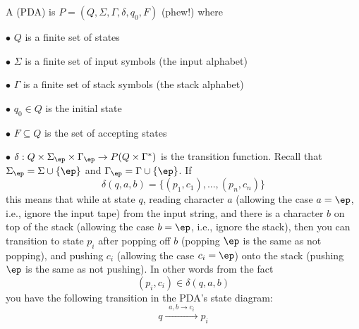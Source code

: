 \begin{defn}
A  (PDA) is $P = (Q, \Sigma, \Gamma, \delta,
q_0, F)$ (phew!) where
\begin{tightlist}
\item[$\bullet$] $Q$ is a finite set of states
\item[$\bullet$] $\Sigma$ is a finite set of input symbols (the input alphabet)
\item[$\bullet$] $\Gamma$ is a finite set of stack symbols (the stack alphabet)
\item[$\bullet$] $q_0 \in Q$ is the initial state
\item[$\bullet$] $F \subseteq Q$ is the set of accepting states
\item[$\bullet$] $\delta : Q \times \Sigma_\ep \times \Gamma_\ep
\rightarrow P(Q \times \Gamma^*)$ is the transition function.
Recall that $\Sigma_\ep = \Sigma \cup \{\ep\}$ and
$\Gamma_\ep = \Gamma \cup \{\ep\}$.
If
\[
\delta(q, a, b) = \{(p_1, c_1), ..., (p_n, c_n)\}
\]
this means that while at state $q$, reading character $a$ 
(allowing the case $a = \ep$, i.e., ignore the input tape)
from the input string, and there is
a character $b$ on top of the stack (allowing the case $b = \ep$, i.e.,
ignore the stack),
then you can transition to state $p_i$ after popping off $b$
(popping $\ep$ is the same as not popping), and
pushing $c_i$ (allowing the case $c_i = \ep$) onto the stack
(pushing $\ep$ is the same as not pushing).
In other words from the fact
\[
(p_i, c_i) \in \delta(q, a, b)
\]
you have the following transition in the PDA's state diagram:
\[
q \xrightarrow{\,\,\,{a, b\rightarrow c_i}\,\,\,} p_i
\]
\end{tightlist}
\end{defn}

